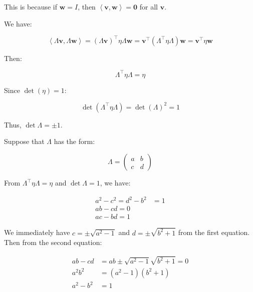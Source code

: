 \documentclass[12pt]{article}
\begin{document}

This is because if $\mathbf{w} = I$, then $\left\langle \mathbf{v}, \mathbf{w} \right\rangle = \mathbf{0}$ for all $\mathbf{v}$.

We have:

\begin{equation}
    \left\langle \Lambda \mathbf{v}, \Lambda \mathbf{w} \right\rangle = (\Lambda \mathbf{v})^{\intercal} \eta \Lambda \mathbf{w} = \mathbf{v}^{\intercal} (\Lambda^{\intercal} \eta \Lambda) \mathbf{w} = \mathbf{v}^{\intercal} \eta \mathbf{w}
\end{equation}

Then:

\begin{equation}
    \Lambda^{\intercal} \eta \Lambda = \eta
\end{equation}

Since $\det(\eta) = 1$:

\begin{equation}
    \det(\Lambda^{\intercal} \eta \Lambda) = \det(\Lambda)^{2} = 1
\end{equation}

Thus, $\det{\Lambda} = \pm 1$.

Suppose that $\Lambda$ has the form:

\begin{equation}
    \Lambda = \begin{pmatrix}
        a & b \\
        c & d
    \end{pmatrix}
\end{equation}

From $\Lambda^{\intercal} \eta \Lambda = \eta$ and $\det{\Lambda} = 1$, we have:

\begin{equation}
    \begin{split}
        a^{2} - c^{2} = d^{2} - b^{2} &= 1 \\
        ab - cd = 0 \\
        ac - bd = 1
    \end{split}
\end{equation}

We immediately have $c = \pm \sqrt{a^{2} - 1}$ and $d = \pm \sqrt{b^{2} + 1}$ from the first equation. Then from the second equation:

\begin{equation}
    \begin{split}
        ab - cd &= ab \pm \sqrt{a^{2} - 1} \sqrt{b^{2} + 1} = 0 \\
        a^{2} b^{2} &= (a^{2} - 1) (b^{2} + 1) \\
        a^{2} - b^{2} &= 1
    \end{split}
\end{equation}
\end{document}
